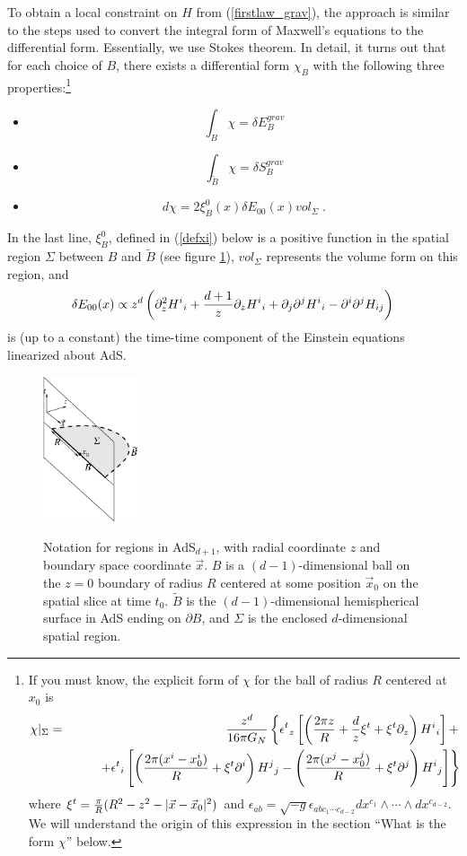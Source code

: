 \documentclass[12pt,epsf]{article}
\newcommand{\be}{\begin{equation}}
\newcommand{\ee}{\end{equation}}
\newcommand{\bea}{\begin{eqnarray}}
\newcommand{\eea}{\end{eqnarray}}
\begin{document}
To obtain a local constraint on $H$ from (\ref{firstlaw_grav}), the approach is similar to the steps used to convert the integral form of Maxwell's equations to the differential form. Essentially, we use Stokes theorem. In detail, it turns out that for each choice of $B$, there exists a differential form $\chi_B$ with the following three properties:\footnote{If you must know, the explicit form of $\chi$ for the ball of radius $R$ centered at $x_0$ is
\bea
  \chi|_\Sigma &=&  {z^d \over 16\pi G_N}\left\{   \epsilon^t {}_z \left[\left({2\pi z \over R} + {d \over z} \xi^t + \xi^t \partial_z\right) H^i{}_i\right]+ \right. \\
  & & \left.\quad\quad +  \epsilon^t {}_i \left[ \left({2\pi (x^i-x_0^i) \over R} + \xi^t \partial^i \right) H^j{}_{j} - \left({2\pi (x^j-x_0^j) \over R} + \xi^t \partial^j \right) H^i{}_{j} \right]\right\} \notag
\eea
where $\xi^t = {\pi \over R} (R^2 - z^2 -|\vec{x}-\vec{x}_0|^2)$ and $
\epsilon_{ab} = \sqrt{-g} \epsilon_{a b c_1 \cdots c_{d-2}} dx^{c_1} \wedge \cdots \wedge dx^{c_{d-2}}$. We will understand the origin of this expression in the section ``What is the form $\chi$'' below.}
\begin{itemize}
\item
\be
\label{prop1}
\int_B \chi = \delta E^{grav}_B
\ee
\item
\be
\label{prop2}
\int_{\tilde{B}} \chi = \delta S^{grav}_B
\ee
\item
\be
\label{prop3}
d \chi = 2 \xi_B^0(x) \delta E_{00}(x) {vol}_\Sigma \;   .
\ee
\end{itemize}
In the last line, $\xi_B^0$, defined in (\ref{defxi}) below is a positive function in the spatial region $\Sigma$ between $B$ and $\tilde{B}$ (see figure \ref{notation2}), ${vol}_\Sigma$ represents the volume form on this region, and
\be
\delta E_{00}(x) \propto z^d \left(\partial_z^2 H^i{}_{i} + {d+1 \over z} \partial_z H^i{}_{i} +  \partial_j \partial^j H^i{}_{i} -  \partial^i \partial^j H_{ij}\right)
\ee
is (up to a constant) the time-time component of the Einstein equations linearized about AdS.

\begin{figure}
\centering
\includegraphics[width=0.25\textwidth]{notation2.eps}\\
\caption{Notation for regions in AdS$_{d+1}$, with radial coordinate $z$ and boundary space coordinate $\vec{x}$. $B$ is a $(d-1)$-dimensional ball on the $z=0$ boundary of radius $R$ centered at some position $\vec{x}_0$ on the spatial slice at time $t_0$. $\tilde{B}$ is the $(d-1)$-dimensional hemispherical surface in AdS ending on $\partial B$, and $\Sigma$ is the enclosed $d$-dimensional spatial region.}
\label{notation2}
\end{figure}
\end{document}
